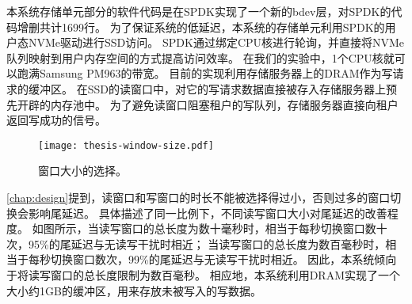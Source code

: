 本系统存储单元部分的软件代码是在SPDK实现了一个新的bdev层，对SPDK的代码增删共计1699行。
为了保证系统的低延迟，本系统的存储单元利用SPDK的用户态NVMe驱动进行SSD访问。
SPDK通过绑定CPU核进行轮询，并直接将NVMe队列映射到用户内存空间的方式提高访问效率。
在我们的实验中，1个CPU核就可以跑满Samsung PM963的带宽。
目前的实现利用存储服务器上的DRAM作为写请求的缓冲区。
在SSD的读窗口中，对它的写请求数据直接被存入存储服务器上预先开辟的内存池中。
为了避免读窗口阻塞租户的写队列，存储服务器直接向租户返回写成功的信号。

\begin{figure}[h]
  \centering
  \texttt{[image: thesis-window-size.pdf]}
  \caption{
        窗口大小的选择。
      }
  \label{fig:impl-window-size}
\end{figure}

\autoref{chap:design}提到，读窗口和写窗口的时长不能被选择得过小，否则过多的窗口切换会影响尾延迟。
具体描述了同一比例下，不同读写窗口大小对尾延迟的改善程度。
如图所示，当读写窗口的总长度为数十毫秒时，相当于每秒切换窗口数十次，95\%的尾延迟与无读写干扰时相近；
当读写窗口的总长度为数百毫秒时，相当于每秒切换窗口数次，99\%的尾延迟与无读写干扰时相近。
因此，本系统倾向于将读写窗口的总长度限制为数百毫秒。
相应地，本系统利用DRAM实现了一个大小约1GB的缓冲区，用来存放未被写入的写数据。